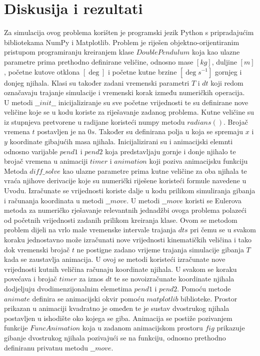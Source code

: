 \documentclass[a4paper,12pt]{article}
\begin{document}
\section{Diskusija i rezultati}
Za simulacija ovog problema korišten je programski jezik Python s pripradajućim bibliotekama NumPy i Matplotlib. Problem je riješen objektno-orijentiranim pristupom programiranju kreiranjem klase $DoublePendulum$ koja kao ulazne parametre prima prethodno definirane veličine, odnosno mase $[kg]$, duljine $[m]$, početne kutove otklona $[\deg]$ i početne kutne brzine  $[\deg s^{-1}]$ gornjeg i donjeg njihala. Klasi su također zadani vremenski parametri $T$ i $dt$ koji redom označavaju trajanje simulacije i vremenski korak između numeričkih operacija.
\\
U metodi $\_\_init\_\_$ inicijaliziranje su sve početne vrijednosti te su definirane nove veličine koje se u kodu koriste za riješavanje zadanog problema. Kutne veličine su iz stupnjeva pretvorene u radijane koristeći numpy metodu $radians()$. Brojač vremena $t$ postavljen je na $0 s$. Također su definirana polja u koja se spremaju $x$ i $y$ koordinate gibajućih masa njihala. Inicijalizirani su i animacijski elemnti odnosno varijable $pend1$ i $pend2$ koja predstavljaju gornje i donje njihalo te brojač vremena u animaciji $timer$ i $animation$ koji poziva animacijsku funkciju
\\
Metoda $diff\_solve$ kao ulazne parametre prima kutne veličine za oba njihala te vraća njihove derivacije koje su numerički riješene koristeći formule navedene u Uvodu. Izračunate se vrijednosti koriste dalje u kodu prilikom simuliranja gibanja i računanja koordinata u metodi $\_\_move$. U metodi $\_\_move$ koristi se Eulerova metoda za numeričko rješavanje relevantnih jednadžbi ovoga problema polazeći od početnih vrijednosti zadanih prilikom kreiranja klase. Ovom se metodom problem dijeli na vrlo male vremenske intervale trajanja $dt s$ pri čemu se u svakom koraku jednostavno može izračunati nove vrijednosti kinematičkih veličina i tako dok vremenski brojač $t$ ne postigne zadano vrijeme trajanja simulacije gibanja $T$ kada se zaustavlja animacija. U ovoj se metodi koristeći izračunate nove vrijednosti kutnih veličina računaju koordinate njihala. U svakom se koraku povećava i brojač $timer$ za iznos $dt$ te se novoizračunate koordinate njihala dodjeljuju dvodimenzijonalnim elemetima $pend1$ i $pend2$. 
Pomoću metode $animate$ definira se animacijski okvir pomoću $matplotlib$ biblioteke. Prostor prikazan u animaciji kvadratno je omeđen te je sustav dvostrukog njihala postavljen u ishodište oko kojega se giba. Animacija se postiže pozivanjem funkcije $FuncAnimation$ koja u zadanom animacijskom prostoru $fig$ prikazuje gibanje dvostrukog njihala pozivajući se na funkciju, odnosno prethodno definiranu privatnu metodu $\_\_move$. 
\end{document}
